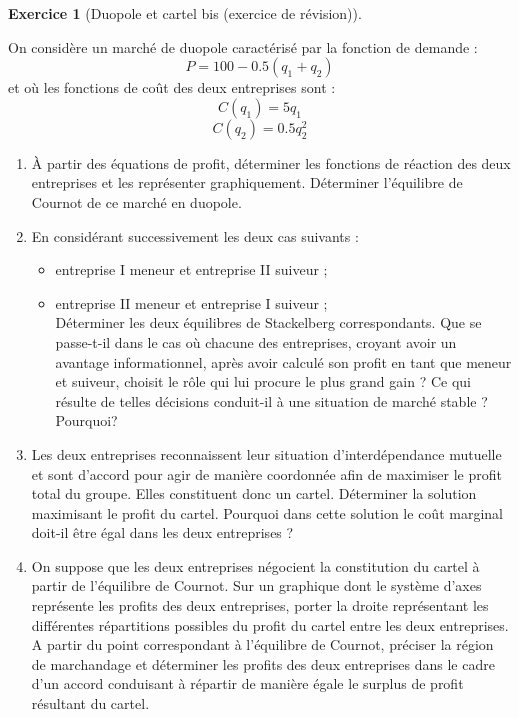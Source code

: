 \documentclass[
]{book}
\providecommand{\tightlist}{%
  \setlength{\itemsep}{0pt}\setlength{\parskip}{0pt}}
\theoremstyle{definition}
\theoremstyle{definition}
\theoremstyle{definition}
\newtheorem{exercise}{Exercice}[chapter]
\theoremstyle{definition}
\theoremstyle{remark}
\begin{document}
\begin{exercise}[Duopole et cartel bis (exercice de révision)]
\protect\hypertarget{exr:cartelexo3}{}\label{exr:cartelexo3}

On considère un marché de duopole caractérisé par la fonction
de demande : \[P=100-0.5\left(q_{1}+q_{2}\right)\] et où les fonctions
de coût des deux entreprises sont : \[C\left(q_{1}\right)=5q_{1}\]
\[C\left(q_{2}\right)=0.5q_{2}^{2}\]

\begin{enumerate}
\def\labelenumi{\arabic{enumi}.}
\tightlist
\item
  À partir des équations de profit, déterminer les fonctions de réaction des deux entreprises et les représenter graphiquement.
  Déterminer l'équilibre de Cournot de ce marché en duopole.
\item
  En considérant successivement les deux cas suivants :

  \begin{itemize}
  \tightlist
  \item
    entreprise I meneur et entreprise II suiveur ;
  \item
    entreprise II meneur et entreprise I suiveur ;\\
    Déterminer les deux équilibres de Stackelberg correspondants. Que se
    passe-t-il dans le cas où chacune des entreprises, croyant avoir un
    avantage informationnel, après avoir calculé son profit en tant que
    meneur et suiveur, choisit le rôle qui lui procure le plus grand
    gain ? Ce qui résulte de telles décisions conduit-il à une situation
    de marché stable ? Pourquoi?
  \end{itemize}
\item
  Les deux entreprises reconnaissent leur situation d'interdépendance mutuelle et sont d'accord pour agir de manière coordonnée afin de maximiser le profit total du groupe. Elles constituent donc un cartel.
  Déterminer la solution maximisant le profit du cartel. Pourquoi dans
  cette solution le coût marginal doit-il être égal dans les deux
  entreprises ?
\item
  On suppose que les deux entreprises négocient la constitution du cartel à partir de l'équilibre de Cournot. Sur un graphique dont le système d'axes représente les profits des deux entreprises, porter la droite représentant les différentes répartitions possibles du profit du cartel entre les deux entreprises. A partir du point correspondant à l'équilibre de Cournot, préciser la région de marchandage et déterminer les profits des deux entreprises dans le cadre d'un accord conduisant à répartir de manière égale le surplus de profit résultant du cartel.
\end{enumerate}

\end{exercise}
\end{document}
